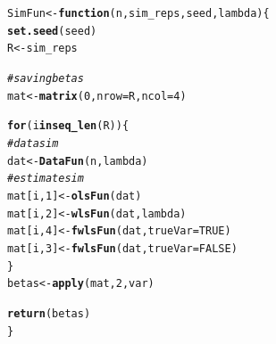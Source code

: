 \documentclass{article}\usepackage[]{graphicx}\usepackage[]{color}
\makeatletter
\newcommand{\hlnum}[1]{\textcolor[rgb]{0.686,0.059,0.569}{#1}}%
\newcommand{\hlcom}[1]{\textcolor[rgb]{0.678,0.584,0.686}{\textit{#1}}}%
\newcommand{\hlstd}[1]{\textcolor[rgb]{0.345,0.345,0.345}{#1}}%
\newcommand{\hlkwa}[1]{\textcolor[rgb]{0.161,0.373,0.58}{\textbf{#1}}}%
\newcommand{\hlkwb}[1]{\textcolor[rgb]{0.69,0.353,0.396}{#1}}%
\newcommand{\hlkwc}[1]{\textcolor[rgb]{0.333,0.667,0.333}{#1}}%
\newcommand{\hlkwd}[1]{\textcolor[rgb]{0.737,0.353,0.396}{\textbf{#1}}}%
\newenvironment{kframe}{%
 \def\at@end@of@kframe{}%
 \ifinner\ifhmode%
  \def\at@end@of@kframe{\end{minipage}}%
  \begin{minipage}{\columnwidth}%
 \fi\fi%
 \def\FrameCommand##1{\hskip\@totalleftmargin \hskip-\fboxsep
 \colorbox{shadecolor}{##1}\hskip-\fboxsep
     \hskip-\linewidth \hskip-\@totalleftmargin \hskip\columnwidth}%
 \MakeFramed {\advance\hsize-\width
   \@totalleftmargin\z@ \linewidth\hsize
   \@setminipage}}%
 {\par\unskip\endMakeFramed%
 \at@end@of@kframe}
\newenvironment{knitrout}{}{} %
\makeatother
\begin{document}
\begin{knitrout}
\color{fgcolor}\begin{kframe}
\begin{alltt}
\hlstd{SimFun} \hlkwb{<-} \hlkwa{function}\hlstd{(}\hlkwc{n}\hlstd{,} \hlkwc{sim_reps}\hlstd{,} \hlkwc{seed}\hlstd{,} \hlkwc{lambda}\hlstd{) \{}
    \hlkwd{set.seed}\hlstd{(seed)}
    \hlstd{R} \hlkwb{<-} \hlstd{sim_reps}

    \hlcom{# saving betas}
    \hlstd{mat} \hlkwb{<-} \hlkwd{matrix}\hlstd{(}\hlnum{0}\hlstd{,} \hlkwc{nrow} \hlstd{= R,} \hlkwc{ncol} \hlstd{=} \hlnum{4}\hlstd{)}

    \hlkwa{for} \hlstd{(i} \hlkwa{in} \hlkwd{seq_len}\hlstd{(R)) \{}
    \hlcom{# data sim}
    \hlstd{dat} \hlkwb{<-} \hlkwd{DataFun}\hlstd{(n, lambda)}
    \hlcom{# estimate sim}
    \hlstd{mat[i,}\hlnum{1}\hlstd{]} \hlkwb{<-} \hlkwd{olsFun}\hlstd{(dat)}
    \hlstd{mat[i,}\hlnum{2}\hlstd{]} \hlkwb{<-} \hlkwd{wlsFun}\hlstd{(dat, lambda)}
    \hlstd{mat[i,}\hlnum{4}\hlstd{]}\hlkwb{<-} \hlkwd{fwlsFun}\hlstd{(dat,} \hlkwc{trueVar} \hlstd{=} \hlnum{TRUE}\hlstd{)}
    \hlstd{mat[i,}\hlnum{3}\hlstd{]}\hlkwb{<-} \hlkwd{fwlsFun}\hlstd{(dat,} \hlkwc{trueVar} \hlstd{=} \hlnum{FALSE}\hlstd{)}
    \hlstd{\}}
    \hlstd{betas} \hlkwb{<-} \hlkwd{apply}\hlstd{(mat,} \hlnum{2}\hlstd{, var)}

    \hlkwd{return}\hlstd{(betas)}
\hlstd{\}}
\end{alltt}
\end{kframe}
\end{knitrout}
\end{document}
